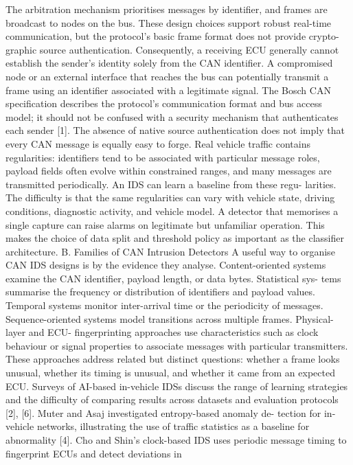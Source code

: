 \documentclass[
]{article}
\begin{document}
The arbitration mechanism prioritises messages by identifier, and frames
are broadcast to nodes on the bus. These design choices support robust
real-time communication, but the protocol's basic frame format does not
provide crypto- graphic source authentication. Consequently, a receiving
ECU generally cannot establish the sender's identity solely from the CAN
identifier. A compromised node or an external interface that reaches the
bus can potentially transmit a frame using an identifier associated with
a legitimate signal. The Bosch CAN specification describes the
protocol's communication format and bus access model; it should not be
confused with a security mechanism that authenticates each sender
{[}1{]}. The absence of native source authentication does not imply that
every CAN message is equally easy to forge. Real vehicle traffic
contains regularities: identifiers tend to be associated with particular
message roles, payload fields often evolve within constrained ranges,
and many messages are transmitted periodically. An IDS can learn a
baseline from these regu- larities. The difficulty is that the same
regularities can vary with vehicle state, driving conditions, diagnostic
activity, and vehicle model. A detector that memorises a single capture
can raise alarms on legitimate but unfamiliar operation. This makes the
choice of data split and threshold policy as important as the classifier
architecture. B. Families of CAN Intrusion Detectors A useful way to
organise CAN IDS designs is by the evidence they analyse.
Content-oriented systems examine the CAN identifier, payload length, or
data bytes. Statistical sys- tems summarise the frequency or
distribution of identifiers and payload values. Temporal systems monitor
inter-arrival time or the periodicity of messages. Sequence-oriented
systems model transitions across multiple frames. Physical-layer and
ECU- fingerprinting approaches use characteristics such as clock
behaviour or signal properties to associate messages with particular
transmitters. These approaches address related but distinct questions:
whether a frame looks unusual, whether its timing is unusual, and
whether it came from an expected ECU. Surveys of AI-based in-vehicle
IDSs discuss the range of learning strategies and the difficulty of
comparing results across datasets and evaluation protocols {[}2{]},
{[}6{]}. Muter and Asaj investigated entropy-based anomaly de- tection
for in-vehicle networks, illustrating the use of traffic statistics as a
baseline for abnormality {[}4{]}. Cho and Shin's clock-based IDS uses
periodic message timing to fingerprint ECUs and detect deviations in
\end{document}
